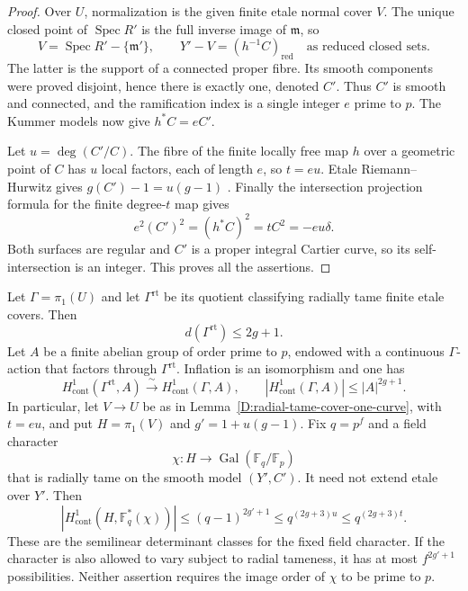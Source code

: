 \begin{proof}
Over $U$, normalization is the given finite etale normal
cover $V$. The unique closed point of $\operatorname{Spec}R'$
is the full inverse image of $\mathfrak m$, so
\[
 V=\operatorname{Spec}R'-\{\mathfrak m'\},\qquad
 Y'-V=(h^{-1}C)_{\mathrm{red}}
 \quad\text{as reduced closed sets}.                   \tag{D.RT.3}
\]
The latter is the support of a connected proper fibre.
Its smooth components were proved disjoint, hence there
is exactly one, denoted $C'$. Thus $C'$ is smooth and
connected, and the ramification index is a single integer
$e$ prime to $p$. The Kummer models now give $h^*C=eC'$.

Let $u=\deg(C'/C)$. The fibre of the finite locally free
map $h$ over a geometric point of $C$ has $u$ local factors,
each of length $e$, so $t=eu$. Etale Riemann--Hurwitz gives
$g(C')-1=u(g-1)$
\citep[Section 53.12 and Lemma 53.12.2, Tags 0C1B and 0C1D]
{StacksSemilinearDeterminantsB}. Finally the intersection
projection formula for the finite degree-$t$ map gives
\[
 e^2(C')^2=(h^*C)^2=tC^2=-eu\delta.
                                                        \tag{D.RT.4}
\]
Both surfaces are regular and $C'$ is a proper integral
Cartier curve, so its self-intersection is an integer.
This proves all the assertions.
\end{proof}

\begin{proposition}
\label{D:one-curve-radial-tame-generators}
Let $\Gamma=\pi_1(U)$ and let $\Gamma^{\mathrm{rt}}$
be its quotient classifying radially tame finite etale
covers. Then
\[
                d(\Gamma^{\mathrm{rt}})\leq 2g+1.
                                                        \tag{D.RT.5}
\]
Let $A$ be a finite abelian group of order prime to $p$,
endowed with a continuous $\Gamma$-action that factors
through $\Gamma^{\mathrm{rt}}$. Inflation is an isomorphism
and one has
\[
 H^1_{\mathrm{cont}}(\Gamma^{\mathrm{rt}},A)
     \xrightarrow{\ \sim\ }H^1_{\mathrm{cont}}(\Gamma,A),
 \qquad |H^1_{\mathrm{cont}}(\Gamma,A)|
                     \leq |A|^{2g+1}.                 \tag{D.RT.6}
\]
In particular, let $V\to U$ be as in
Lemma~\ref{D:radial-tame-cover-one-curve}, with $t=eu$,
and put $H=\pi_1(V)$ and $g'=1+u(g-1)$. Fix $q=p^f$
and a field character
\[
 \chi:H\longrightarrow\operatorname{Gal}
                          (\mathbb F_q/\mathbb F_p)
\]
that is radially tame on the smooth model $(Y',C')$.
It need not extend etale over $Y'$. Then
\[
 |H^1_{\mathrm{cont}}(H,\mathbb F_q^*(\chi))|
       \leq(q-1)^{2g'+1}\leq q^{(2g+3)u}
                                \leq q^{(2g+3)t}.
                                                        \tag{D.RT.7}
\]
These are the semilinear determinant classes for the fixed
field character. If the character is also allowed to vary
subject to radial tameness, it has at most $f^{2g'+1}$
possibilities. Neither assertion requires the image order
of $\chi$ to be prime to $p$.
\end{proposition}

